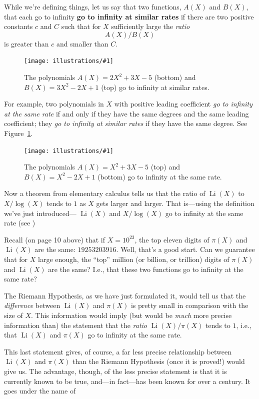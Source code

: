 \documentclass[openany]{book}
\DeclareMathOperator{\Li}{Li}
\newcommand{\ill}[3]{%
   \begin{figure}[H]%
   \vspace{-2ex}
   \centering%
   \texttt{[image: illustrations/\#1]}%
   \caption{#3}%
   \vspace{-2ex}
    \end{figure}}
\theoremstyle{plain}
\theoremstyle{definition}
\newcommand{\RH}{Riemann Hypothesis\index{Riemann Hypothesis}}
\begin{document}
While we're defining things, let us say that two functions, $A(X)$
and $B(X)$, that each go to infinity {\bf go to infinity at
similar rates} if there are two positive constants $c$ and $C$
such that for $X$ sufficiently large the {\it ratio}
$$
      A(X)/B(X)
$$
is greater than $c$ and smaller than $C$.  

    \ill{similar_rates}{1.0}{The polynomials $A(X)=2 X^{2} + 3 X - 5$ (bottom)
and $B(X)=  3 X^{2} - 2 X + 1$ (top) go to infinity at similar rates.\label{fig:simrates}}



For example, two polynomials in $X$ with positive leading coefficient
{\it go to infinity at the same rate} if and only if they have the
same degrees and the same leading coefficient; they {\it go to
  infinity at similar rates} if they have the same degree.
See Figure~\ref{fig:simrates}. %

 \ill{same_rates}{1.0}{The polynomials $A(X)=X^{2} + 3 X - 5$ (top)
and $B(X)= X^{2} - 2 X + 1$ (bottom) go to infinity 
at the same rate.\label{fig:samerate}}
    


Now a theorem from elementary calculus tells us that the ratio of
$\Li(X)$ to $X/\log(X)$ tends to $1$ as $X$ gets larger and larger.
That is---using the definition we've just introduced--- $\Li(X)$ and
$X/\log(X)$ go to infinity at the same rate (see )


Recall (on page 10 above)  that
if $X = 10^{23}$, the top eleven digits of $\pi(X)$ and $\Li(X)$ are the same: $19253203916.$ Well, that's a good start. Can we guarantee that for  $X$ large enough, the ``top'' million (or billion, or trillion) digits of $\pi(X)$ and $\Li(X)$ are the same? I.e., that these two functions go to infinity at the same rate?
  
The \RH{}, as we have just formulated it, would tell us
that the {\it difference} between $\Li(X)$ and $\pi(X)$ is pretty small
in comparison with the size of $X$. This information would imply (but
would be {\it much} more precise information than) the statement that
the {\it ratio} $\Li(X)/\pi(X)$ tends to $1$, i.e., that $\Li(X)$ and
$\pi(X)$ go to infinity at the same rate.

This last statement gives, of course, a far less precise relationship
between $\Li(X)$ and $\pi(X)$ than the \RH{} (once it is proved!)
would give us.  The advantage, though, of the less precise statement
is that it is currently known to be true, and---in fact---has been
known for over a century. It goes under the name of
  
\end{document}
